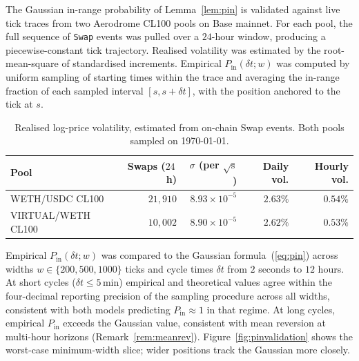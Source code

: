 \documentclass[11pt,a4paper]{article}
\theoremstyle{cgdefinition}
\theoremstyle{cgplain}
\theoremstyle{cgremark}
\begin{document}
The Gaussian in-range probability of Lemma~\ref{lem:pin} is validated against live tick traces from two Aerodrome CL100 pools on Base mainnet. For each pool, the full sequence of \texttt{Swap} events was pulled over a $24$-hour window, producing a piecewise-constant tick trajectory. Realised volatility was estimated by the root-mean-square of standardised increments. Empirical $P_{\text{in}}(\delta t; w)$ was computed by uniform sampling of starting times within the trace and averaging the in-range fraction of each sampled interval $[s, s + \delta t]$, with the position anchored to the tick at $s$.

\begin{table}[H]
\centering
\small
\begin{tabular}{@{}lrrrr@{}}
\toprule
Pool & Swaps ($24$\,h) & $\sigma$ (per $\sqrt{\text{s}}$) & Daily vol. & Hourly vol. \\
\midrule
WETH/USDC CL100 & $21{,}910$ & $8.93\times 10^{-5}$ & $2.63\%$ & $0.54\%$ \\
VIRTUAL/WETH CL100 & $10{,}002$ & $8.90\times 10^{-5}$ & $2.62\%$ & $0.53\%$ \\
\bottomrule
\end{tabular}
\caption{Realised log-price volatility, estimated from on-chain Swap events. Both pools sampled on \today.}
\label{tab:vol}
\end{table}

Empirical $P_{\text{in}}(\delta t; w)$ was compared to the Gaussian formula~(\ref{eq:pin}) across widths $w \in \{200, 500, 1000\}$ ticks and cycle times $\delta t$ from $2$ seconds to $12$ hours. At short cycles ($\delta t \leq 5$\,min) empirical and theoretical values agree within the four-decimal reporting precision of the sampling procedure across all widths, consistent with both models predicting $P_{\text{in}} \approx 1$ in that regime. At long cycles, empirical $P_{\text{in}}$ exceeds the Gaussian value, consistent with mean reversion at multi-hour horizons (Remark~\ref{rem:meanrev}). Figure~\ref{fig:pinvalidation} shows the worst-case minimum-width slice; wider positions track the Gaussian more closely.
\end{document}
